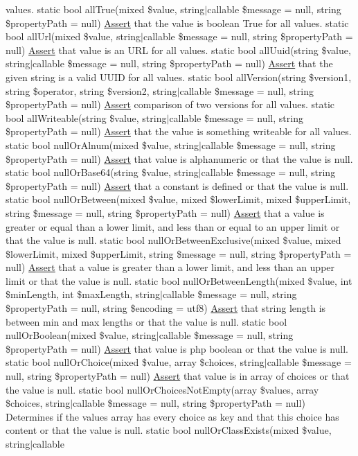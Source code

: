 values.  static bool all\+True(mixed \$value, string$\vert$callable \$message = null, string \$property\+Path = null) \mbox{\hyperlink{class_assert_1_1_assert}{Assert}} that the value is boolean True for all values.  static bool all\+Url(mixed \$value, string$\vert$callable \$message = null, string \$property\+Path = null) \mbox{\hyperlink{class_assert_1_1_assert}{Assert}} that value is an U\+RL for all values.  static bool all\+Uuid(string \$value, string$\vert$callable \$message = null, string \$property\+Path = null) \mbox{\hyperlink{class_assert_1_1_assert}{Assert}} that the given string is a valid U\+U\+ID for all values.  static bool all\+Version(string \$version1, string \$operator, string \$version2, string$\vert$callable \$message = null, string \$property\+Path = null) \mbox{\hyperlink{class_assert_1_1_assert}{Assert}} comparison of two versions for all values.  static bool all\+Writeable(string \$value, string$\vert$callable \$message = null, string \$property\+Path = null) \mbox{\hyperlink{class_assert_1_1_assert}{Assert}} that the value is something writeable for all values.  static bool null\+Or\+Alnum(mixed \$value, string$\vert$callable \$message = null, string \$property\+Path = null) \mbox{\hyperlink{class_assert_1_1_assert}{Assert}} that value is alphanumeric or that the value is null.  static bool null\+Or\+Base64(string \$value, string$\vert$callable \$message = null, string \$property\+Path = null) \mbox{\hyperlink{class_assert_1_1_assert}{Assert}} that a constant is defined or that the value is null.  static bool null\+Or\+Between(mixed \$value, mixed \$lower\+Limit, mixed \$upper\+Limit, string \$message = null, string \$property\+Path = null) \mbox{\hyperlink{class_assert_1_1_assert}{Assert}} that a value is greater or equal than a lower limit, and less than or equal to an upper limit or that the value is null.  static bool null\+Or\+Between\+Exclusive(mixed \$value, mixed \$lower\+Limit, mixed \$upper\+Limit, string \$message = null, string \$property\+Path = null) \mbox{\hyperlink{class_assert_1_1_assert}{Assert}} that a value is greater than a lower limit, and less than an upper limit or that the value is null.  static bool null\+Or\+Between\+Length(mixed \$value, int \$min\+Length, int \$max\+Length, string$\vert$callable \$message = null, string \$property\+Path = null, string \$encoding = \textquotesingle{}utf8\textquotesingle{}) \mbox{\hyperlink{class_assert_1_1_assert}{Assert}} that string length is between min and max lengths or that the value is null.  static bool null\+Or\+Boolean(mixed \$value, string$\vert$callable \$message = null, string \$property\+Path = null) \mbox{\hyperlink{class_assert_1_1_assert}{Assert}} that value is php boolean or that the value is null.  static bool null\+Or\+Choice(mixed \$value, array \$choices, string$\vert$callable \$message = null, string \$property\+Path = null) \mbox{\hyperlink{class_assert_1_1_assert}{Assert}} that value is in array of choices or that the value is null.  static bool null\+Or\+Choices\+Not\+Empty(array \$values, array \$choices, string$\vert$callable \$message = null, string \$property\+Path = null) Determines if the values array has every choice as key and that this choice has content or that the value is null.  static bool null\+Or\+Class\+Exists(mixed \$value, string$\vert$callable 